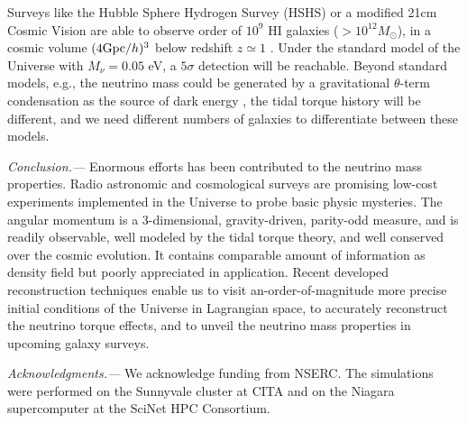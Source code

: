 \documentclass[aps,prd,twocolumn,amsmath,amssymb,amsfont,superscriptaddress,nofootinbib]{revtex4-1}
\begin{document}
Surveys like the Hubble Sphere Hydrogen Survey (HSHS) \citep{2006astro.ph..6104P} or a modified 21cm Cosmic Vision \citep{2018arXiv180207216D} are able to observe order of $10^9$ HI galaxies ($>10^{12}M_\odot$), 
in a cosmic volume $(4{\rm Gpc}/h)^3$ below redshift $z\simeq 1$ \citep{2004MNRAS.350.1210Z}. 
Under the standard model of the Universe with $M_\nu=0.05$ eV, a $5\sigma$ detection will be reachable.
Beyond standard models, e.g., the neutrino mass could be generated by a gravitational $\theta$-term condensation as the source of dark energy \citep{2016PhRvD..93k3002D}, the tidal torque history will be different, and we need different numbers of galaxies to differentiate between these models.


\textit{Conclusion.---}
Enormous efforts has been contributed to the neutrino mass properties.
Radio astronomic and cosmological surveys are promising low-cost experiments implemented in the Universe to probe basic physic mysteries. 
The angular momentum is a 3-dimensional, gravity-driven, parity-odd measure, 
and is readily observable, well modeled by the tidal torque theory, and well conserved over the cosmic evolution.
It contains comparable amount of information as density field but poorly appreciated in application.
Recent developed reconstruction techniques enable us to visit an-order-of-magnitude more precise initial conditions of the Universe in Lagrangian space, 
to accurately reconstruct the neutrino torque effects,
and to unveil the neutrino mass properties in upcoming galaxy surveys.

\textit{Acknowledgments.---}
We acknowledge funding from NSERC.
The simulations were performed on the Sunnyvale cluster at CITA and on the Niagara supercomputer at the SciNet HPC Consortium.

\end{document}
